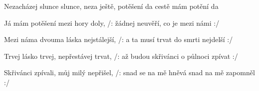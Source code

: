\begin{TEXT}{Nezacházej slunce}
\SLOKA {} slunce, neza ještě, 
 potěšení  da cestě 
 mám potění  da  

\SLOKA Já mám potěšení mezi hory doly, 
/: žádnej neuvěří, co je mezi námi :/

\SLOKA Mezi náma dvouma láska nejstálejší, 
/: a ta musí trvat do smrti nejdelší :/

\SLOKA Trvej lásko trvej, nepřestávej trvat, 
/: až budou skřivánci o půlnoci zpívat :/

\SLOKA Skřivánci zpívali, můj milý nepřišel,
/: snad se na mě hněvá snad na mě zapomněl :/
\end{TEXT}